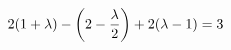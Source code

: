 \documentclass[preview]{standalone}
\begin{document}
\begin{align*}
\special{dvisvgm:raw <g id='unique000'>}2(1+\lambda)-\left(2-\dfrac{\lambda}{2}\right)+2(\lambda-1)=3\special{dvisvgm:raw </g>}
\end{align*}
\end{document}
